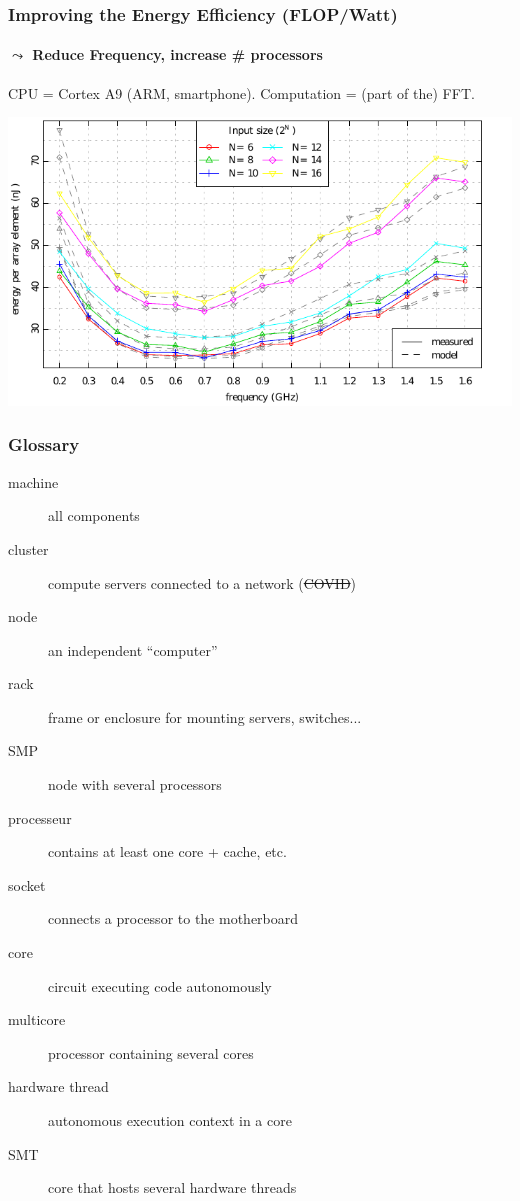 \documentclass[xcolor={x11names,svgnames,psnames}]{beamer}
\begin{document}
\begin{frame}
  \frametitle{Improving the Energy Efficiency (FLOP/Watt)}
  \framesubtitle{$\leadsto$ Reduce Frequency, increase \# processors}

  \centering

  \small CPU = Cortex A9 (ARM, smartphone). Computation = (part of the) FFT. 
  
  \includegraphics[width=\textwidth]{cpu_freq_scaling.pdf}
\end{frame}


\begin{frame}
  \frametitle{Glossary}

    \begin{description}
    \item[machine] all components

    \item[cluster] compute servers connected to a network (\sout{COVID})
      
    \item[node] an independent ``computer''

    \item[rack] frame or enclosure for mounting servers, switches...

    \item[SMP] node with several processors

    \item[processeur] contains at least one core + cache, etc.
  
    \item[socket] connects a processor to the motherboard

    \item[core] circuit executing code autonomously

    \item[multicore] processor containing several cores
  
    \item[hardware thread] autonomous execution context in a core

    \item[SMT] core that hosts several hardware threads
    \end{description}

\end{frame}
\end{document}
